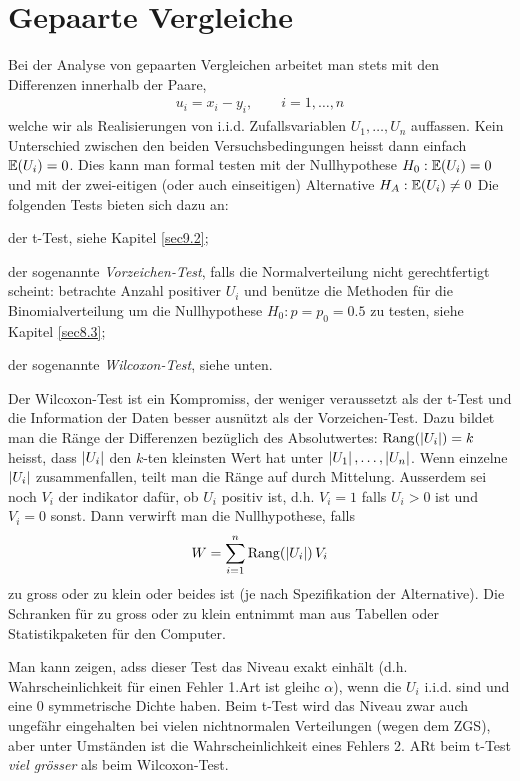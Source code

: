 \section{Gepaarte Vergleiche}
\label{sec11.2}
Bei der Analyse von gepaarten Vergleichen arbeitet man stets mit den Differenzen innerhalb der Paare,
\begin{gather*}
	u_i=x_i-y_i,\qquad i=1,\ldots,n
\end{gather*}
welche wir als Realisierungen von i.i.d. Zufallsvariablen $U_1,\ldots,U_n$ auffassen. Kein Unterschied zwischen den beiden Versuchsbedingungen heisst dann einfach $\operatorname{\mathbb E}(U_i)=0$. Dies kann man formal testen mit der Nullhypothese $H_0:\operatorname{\mathbb E}(U_i)=0$ und mit der zwei-eitigen (oder auch einseitigen) Alternative $H_A:\operatorname{\mathbb E}(U_i)\neq 0$ Die folgenden Tests bieten sich dazu an:
\begin{compactenum}[1.]
	\item der t-Test, siehe Kapitel \ref{sec9.2};
	\item der sogenannte \emph{Vorzeichen-Test}, falls die Normalverteilung nicht gerechtfertigt scheint: betrachte Anzahl positiver $U_i$ und benütze die Methoden für die Binomialverteilung um die Nullhypothese $H_0:p=p_0=0.5$ zu testen, siehe Kapitel \ref{sec8.3};
	\item der sogenannte \emph{Wilcoxon-Test}, siehe unten.
\end{compactenum}
Der Wilcoxon-Test ist ein Kompromiss, der weniger veraussetzt als der t-Test und die Information der Daten besser ausnützt als der Vorzeichen-Test. Dazu bildet man die Ränge der Differenzen bezüglich des Absolutwertes: $\operatorname{Rang}(\left\lvert U_i \right\rvert)=k$ heisst, dass $\left\lvert U_i \right\rvert$ den $k$-ten kleinsten Wert hat unter $\left\lvert U_1 \right\rvert,\ldots,\left\lvert U_n \right\rvert$. Wenn einzelne $\left\lvert U_i \right\rvert$ zusammenfallen, teilt man die Ränge auf durch Mittelung. Ausserdem sei noch $V_i$ der indikator dafür, ob $U_i$ positiv ist, d.h. $V_i=1$ falls $U_i>0$ ist und $V_i=0$ sonst. Dann verwirft man die Nullhypothese, falls
\begin{gather*}
	W=\sum_{i=1}^{n}\operatorname{Rang}\!\left( \left\lvert U_i \right\rvert \right)V_i
\end{gather*}
zu gross oder zu klein oder beides ist (je nach Spezifikation der Alternative). Die Schranken für zu gross oder zu klein entnimmt man aus Tabellen oder Statistikpaketen für den Computer.


Man kann zeigen, adss dieser Test das Niveau exakt einhält (d.h. Wahrscheinlichkeit für einen Fehler 1.Art ist gleihc $\alpha$), wenn die $U_i$ i.i.d. sind und eine 0 symmetrische Dichte haben. Beim t-Test wird das Niveau zwar auch ungefähr eingehalten bei vielen nichtnormalen Verteilungen (wegen dem ZGS), aber unter Umständen ist die Wahrscheinlichkeit eines Fehlers 2. ARt beim t-Test \emph{viel grösser} als beim Wilcoxon-Test.

